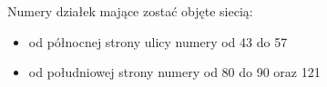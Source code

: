 	Numery działek mające zostać objęte siecią:
	\begin{itemize}
		\item od północnej strony ulicy numery od 43 do 57
		\item od południowej strony numery od 80 do 90 oraz 121
	\end{itemize}
